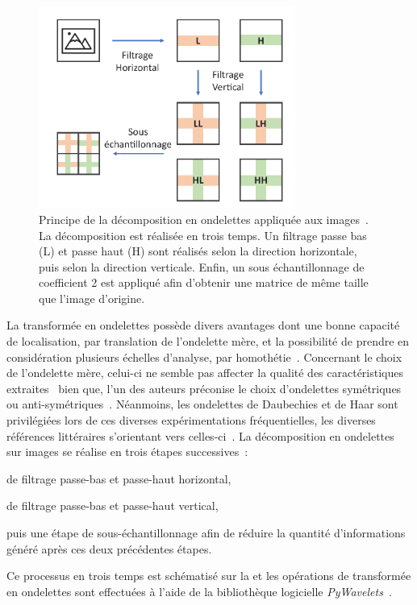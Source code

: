 \begin{figure}[H]
    \centering
    \includegraphics[width=0.75\textwidth]{contents/chapter_5/resources/scheme_dwt.pdf}
    \caption{Principe de la décomposition en ondelettes appliquée aux images~\cite{Livens1997}. La décomposition est réalisée en trois temps. Un filtrage passe bas (L) et passe haut (H) sont réalisés selon la direction horizontale, puis selon la direction verticale. Enfin, un sous échantillonnage de coefficient 2 est appliqué afin d'obtenir une matrice de même taille que l'image d'origine.}
    \label{fig:scheme_dwt}
\end{figure}\par 

La transformée en ondelettes possède divers avantages dont une bonne capacité de localisation, par translation de l'ondelette mère, et la possibilité de prendre en considération plusieurs échelles d'analyse, par homothétie~\cite{Livens1997,Wiltgen2008}. Concernant le choix de l'ondelette mère, celui-ci ne semble pas affecter la qualité des caractéristiques extraites~\cite{Fatemi1996, Livens1997} bien que, l'un des auteurs préconise le choix d'ondelettes symétriques ou anti-symétriques~\cite{Livens1997}. Néanmoins, les ondelettes de Daubechies et de Haar sont privilégiées lors de ces diverses expérimentations fréquentielles, les diverses références littéraires s'orientant vers  celles-ci~\cite{Wiltgen2008,Halimi2017a}. La décomposition en ondelettes sur images se réalise en trois étapes successives~: 
\begin{inlinerate}
    \item de filtrage passe-bas et passe-haut horizontal,
    \item de filtrage passe-bas et passe-haut vertical,
    \item puis une étape de sous-échantillonnage afin de réduire la quantité d'informations généré après ces deux précédentes étapes.
\end{inlinerate} Ce processus en trois temps est schématisé sur la  et les opérations de transformée en ondelettes sont effectuées à l'aide de la bibliothèque logicielle \textit{PyWavelets}~\cite{lee2006}.\par

